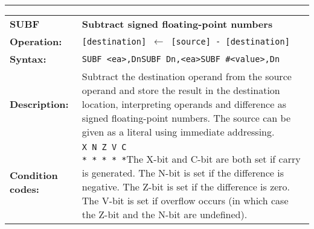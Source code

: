 \documentclass[]{article}
\begin{document}
\begin{appendices}
\noindent\rule{10cm}{1pt}\newline %
\setlength\extrarowheight{5pt} %
\begin{tabularx}{\textwidth}{lL}
  {\Large \textbf{SUBF}} 	& {\Large \textbf{Subtract signed floating-point numbers}}\\
  \textbf{Operation:} 		& \texttt{[destination] $\leftarrow$ [source] - [destination]}\\
  \textbf{Syntax:}  		& \texttt{SUBF <ea>,Dn}\newline\texttt{SUBF Dn,<ea>}\newline\texttt{SUBF \#<value>,Dn}\\
  \textbf{Description:}  	& Subtract the destination operand from the source operand and store the
result in the destination location, interpreting operands and difference as signed floating-point numbers. The source can be given as a literal using immediate addressing.\\
  \textbf{Condition codes:} & \texttt{X N Z V C\newline * * * * *}\newline\newline The X-bit and C-bit are both set if carry is generated. The N-bit is set if the difference is negative. The Z-bit is set if the difference is zero. The V-bit is set if overflow occurs (in which case the Z-bit and the N-bit are undefined).\\
\end{tabularx}
\newline

\newpage


\end{appendices}
\end{document}

